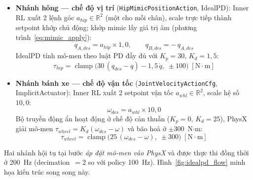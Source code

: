 \begin{itemize}
    \item \textbf{Nhánh hông — chế độ vị trí} (\texttt{HipMimicPositionAction},
    IdealPD): Inner RL xuất 2 lệnh góc $a_{hip}\in\mathbb{R}^2$ (một cho mỗi
    chân), scale trực tiếp thành setpoint khớp chủ động; khớp mimic lấy giá
    trị âm (phương trình~\eqref{eq:mimic_apply}):
    \begin{equation}
        q_{A,des} = a_{hip}\times 1{,}0,\qquad q_{B,des} = -\,q_{A,des}
        \label{eq:hip_setpoint}
    \end{equation}
    IdealPD tính mô-men theo luật PD đầy đủ với $K_p = 30$, $K_d = 1{,}5$:
    \begin{equation}
        \tau_{hip} = \operatorname{clamp}\!\bigl(30\,(q_{des}-q) - 1{,}5\,\dot{q},\;\pm100\bigr)\;\mathrm{[N{\cdot}m]}
        \label{eq:tau_hip_idealpd}
    \end{equation}

    \item \textbf{Nhánh bánh xe — chế độ vận tốc}
    (\texttt{JointVelocityActionCfg}, ImplicitActuator): Inner RL xuất 2
    setpoint vận tốc $a_{whl}\in\mathbb{R}^2$, scale hệ số $10{,}0$:
    \begin{equation}
        \omega_{des} = a_{whl} \times 10{,}0
        \label{eq:wheel_setpoint_idealpd}
    \end{equation}
    Bộ truyền động ẩn hoạt động ở chế độ cản thuần ($K_p=0$, $K_d=25$), PhysX
    giải mô-men $\tau_{wheel}=K_d(\omega_{des}-\omega)$ và bão hoà ở
    $\pm300$~N$\cdot$m:
    \begin{equation}
        \tau_{wheel} = \operatorname{clamp}\!\bigl(25\,(\omega_{des}-\omega),\;\pm300\bigr)\;\mathrm{[N{\cdot}m]}
        \label{eq:tau_wheel_idealpd}
    \end{equation}
\end{itemize}

Hai nhánh hội tụ tại bước \textit{áp đặt mô-men vào PhysX} và được thực thi
đồng thời ở 200~Hz (decimation~$=2$ so với policy 100~Hz).
Hình~\ref{fig:idealpd_flow} minh họa kiến trúc song song này.

